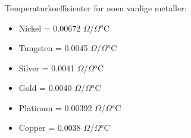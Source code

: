 \documentclass[aspectratio=169,xcolor=dvipsnames]{beamer}
\begin{document}
%
%
%
%
%
%
%
%
%
%
%
%
%
\begin{frame}
	\frametitle{}

Temperaturkoeffisienter for noen vanlige metaller:
\begin{itemize}
\item Nickel = 0.00672 $\Omega$/$\Omega$$^{o}$C
\item Tungsten = 0.0045 $\Omega$/$\Omega$$^{o}$C
\item Silver = 0.0041 $\Omega$/$\Omega$$^{o}$C
\item Gold = 0.0040 $\Omega$/$\Omega$$^{o}$C
\item Platinum = 0.00392 $\Omega$/$\Omega$$^{o}$C
\item Copper = 0.0038 $\Omega$/$\Omega$$^{o}$C
\end{itemize}
\end{frame}
\end{document}
